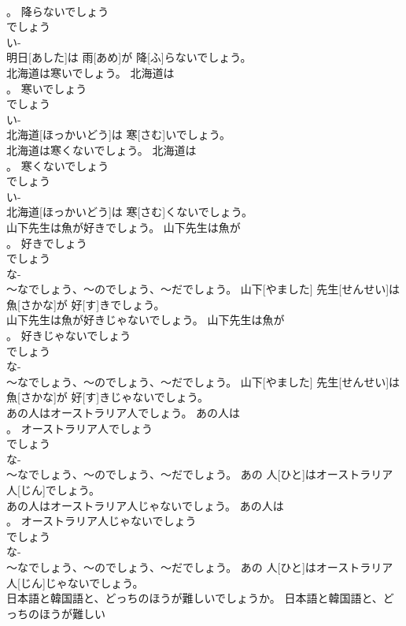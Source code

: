 \documentclass[8pt]{extreport}
\begin{document}
\begin{CJK}{UTF8}{min}
\\	。	降らないでしょう	
\\	でしょう 
\\	い-
\\	明日[あした]は 雨[あめ]が 降[ふ]らないでしょう。	
\\	北海道は寒いでしょう。	北海道は
\\	。	寒いでしょう	
\\	でしょう 
\\	い-
\\	北海道[ほっかいどう]は 寒[さむ]いでしょう。	
\\	北海道は寒くないでしょう。	北海道は
\\	。	寒くないでしょう	
\\	でしょう 
\\	い-
\\	北海道[ほっかいどう]は 寒[さむ]くないでしょう。	
\\	山下先生は魚が好きでしょう。	山下先生は魚が
\\	。	好きでしょう	
\\	でしょう 
\\	な-
\\	～なでしょう、～のでしょう、～だでしょう。	山下[やました] 先生[せんせい]は 魚[さかな]が 好[す]きでしょう。	
\\	山下先生は魚が好きじゃないでしょう。	山下先生は魚が
\\	。	好きじゃないでしょう	
\\	でしょう 
\\	な-
\\	～なでしょう、～のでしょう、～だでしょう。	山下[やました] 先生[せんせい]は 魚[さかな]が 好[す]きじゃないでしょう。	
\\	あの人はオーストラリア人でしょう。	あの人は
\\	。	オーストラリア人でしょう	
\\	でしょう 
\\	な-
\\	～なでしょう、～のでしょう、～だでしょう。	あの 人[ひと]はオーストラリア 人[じん]でしょう。	
\\	あの人はオーストラリア人じゃないでしょう。	あの人は
\\	。	オーストラリア人じゃないでしょう	
\\	でしょう 
\\	な-
\\	～なでしょう、～のでしょう、～だでしょう。	あの 人[ひと]はオーストラリア 人[じん]じゃないでしょう。	
\\	日本語と韓国語と、どっちのほうが難しいでしょうか。	日本語と韓国語と、どっちのほうが難しい

\end{CJK}
\end{document}
